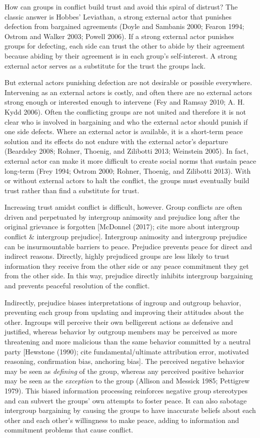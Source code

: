 \documentclass[11pt]{article}
\begin{document}
How can groups in conflict build trust and avoid this spiral of
distrust? The classic answer is Hobbes' Leviathan, a strong external
actor that punishes defection from bargained agreements (Doyle and
Sambanis 2000; Fearon 1994; Ostrom and Walker 2003; Powell 2006). If a
strong external actor punishes groups for defecting, each side can trust
the other to abide by their agreement because abiding by their agreement
is in each group's self-interest. A strong external actor serves as a
substitute for the trust the groups lack.

But external actors punishing defection are not desirable or possible
everywhere. Intervening as an external actors is costly, and often there
are no external actors strong enough or interested enough to intervene
(Fey and Ramsay 2010; A. H. Kydd 2006). Often the conflicting groups are
not united and therefore it is not clear who is involved in bargaining
and who the external actor should punish if one side defects. Where an
external actor is available, it is a short-term peace solution and its
effects do not endure with the external actor's departure (Beardsley
2008; Rohner, Thoenig, and Zilibotti 2013; Weinstein 2005). In fact,
external actor can make it more difficult to create social norms that
sustain peace long-term (Frey 1994; Ostrom 2000; Rohner, Thoenig, and
Zilibotti 2013). With or without external actors to halt the conflict,
the groups must eventually build trust rather than find a substitute for
trust.

Increasing trust amidst conflict is difficult, however. Group conflicts
are often driven and perpetuated by intergroup animosity and prejudice
long after the original grievance is forgotten {[}McDonnel (2017); cite
more about intergroup conflict \& intergroup prejudice{]}. Intergroup
animosity and intergroup prejudice can be insurmountable barriers to
peace. Prejudice prevents peace for direct and indirect reasons.
Directly, highly prejudiced groups are less likely to trust information
they receive from the other side or any peace commitment they get from
the other side. In this way, prejudice directly inhibits intergroup
bargaining and prevents peaceful resolution of the conflict.

Indirectly, prejudice biases interpretations of ingroup and outgroup
behavior, preventing each group from updating and improving their
attitudes about the other. Ingroups will perceive their own belligerent
actions as defensive and justified, whereas behavior by outgroup members
may be perceived as more threatening and more malicious than the same
behavior committed by a neutral party {[}Hewstone (1990); cite
fundamental/ultimate attribution error, motivated reasoning,
confirmation bias, anchoring bias{]}. The perceived negative behavior
may be seen as \emph{defining} of the group, whereas any perceived
positive behavior may be seen as the \emph{exception} to the group
(Allison and Messick 1985; Pettigrew 1979). This biased information
processing reinforces negative group stereotypes and can subvert the
groups' own attempts to foster peace. It can also sabotage intergroup
bargaining by causing the groups to have inaccurate beliefs about each
other and each other's willingness to make peace, adding to information
and commitment problems that cause conflict.
\end{document}
